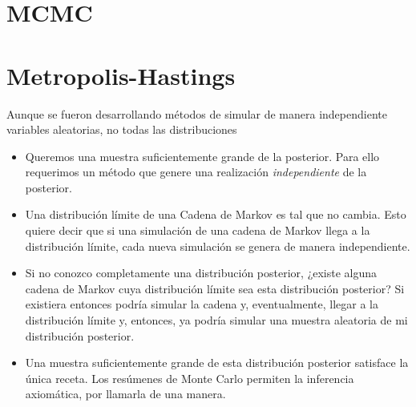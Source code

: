 \section{MCMC}



\section{Metropolis-Hastings}

Aunque se fueron desarrollando métodos de simular de manera independiente variables aleatorias, no todas las distribuciones 

\begin{itemize}
\item Queremos una muestra suficientemente grande de la posterior. Para ello requerimos un método que genere una realización \textit{independiente} de la posterior. 

\item Una distribución límite de una Cadena de Markov es tal que no cambia. Esto quiere decir que si una simulación de una cadena de Markov llega a la distribución límite, cada nueva simulación se genera de manera independiente. 

\item Si no conozco completamente una distribución posterior, ¿existe alguna cadena de Markov cuya distribución límite sea esta distribución posterior? Si existiera entonces podría simular la cadena y, eventualmente, llegar a la distribución límite y, entonces, ya podría simular una muestra aleatoria de mi distribución posterior.

\item Una muestra suficientemente grande de esta distribución posterior satisface la única receta. Los resúmenes de Monte Carlo permiten la inferencia axiomática, por llamarla de una manera.  
\end{itemize}




